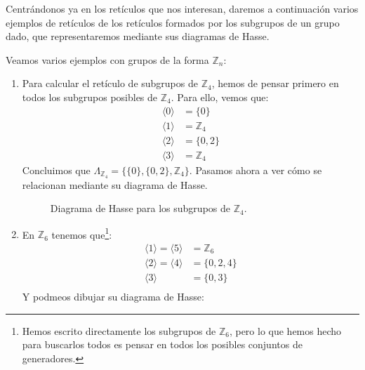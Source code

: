 
Centrándonos ya en los retículos que nos interesan, daremos a continuación varios ejemplos de retículos de los retículos formados por los subgrupos de un grupo dado, que representaremos mediante sus diagramas de Hasse.

\begin{ejemplo}
    Veamos varios ejemplos con grupos de la forma $\mathbb{Z}_n$:
    \begin{enumerate}
        \item Para calcular el retículo de subgrupos de $\mathbb{Z}_4$, hemos de pensar primero en todos los subgrupos posibles de $\mathbb{Z}_4$. Para ello, vemos que:
            \begin{align*}
                \langle {0} \rangle &= \{{0}\} \\
                \langle {1} \rangle &= \mathbb{Z}_4 \\
                \langle {2} \rangle &= \{{0},{2}\} \\
                \langle {3} \rangle &= \mathbb{Z}_4 
            \end{align*}
            Concluimos que $\Lambda_{\mathbb{Z}_4} = \{\{{0}\}, \{{0},{2}\}, \mathbb{Z}_4\}$. Pasamos ahora a ver cómo se relacionan mediante su diagrama de Hasse.
            \begin{figure}[H]
                \centering
                \caption{Diagrama de Hasse para los subgrupos de $\mathbb{Z}_4$.}
            \end{figure}
        \item En $\mathbb{Z}_6$ tenemos que\footnote{Hemos escrito directamente los subgrupos de $\mathbb{Z}_6$, pero lo que hemos hecho para buscarlos todos es pensar en todos los posibles conjuntos de generadores.}:
            \begin{align*}
                \langle {1} \rangle  = \langle {5} \rangle  &= \mathbb{Z}_6 \\
                \langle {2} \rangle = \langle {4} \rangle  &= \{0, 2, 4\} \\
                \langle {3} \rangle  &= \{0,3\} \\
            \end{align*}
            Y podmeos dibujar su diagrama de Hasse:


\end{enumerate}
\end{ejemplo}

